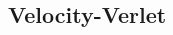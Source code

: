 \documentclass{article}
\begin{document}
\begin{multicols}{2}
%
%
%
%
%
%


\subsection{Velocity-Verlet}\label{sec:VV}


\end{multicols}
\end{document}
